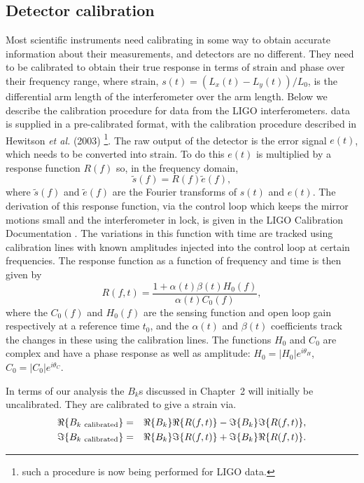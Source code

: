 \subsection{Detector calibration}
Most scientific instruments need calibrating in some way to obtain accurate information about
their measurements, and \gw detectors are no different. They need to be calibrated to obtain their
true response in terms of \gw strain and phase over their frequency range, where strain, $s(t) =
(L_x(t)-L_y(t))/L_0$, is the differential arm length of the interferometer over the arm length.
Below we describe the calibration procedure for data from the LIGO interferometers. \geo data is
supplied in a pre-calibrated format, with the calibration procedure described in Hewitson {\it et
al.} (2003) \cite{Hewitson:2003}\footnote{such a procedure is now being performed for LIGO data.}.
The raw output of the detector is the error signal $e(t)$, which needs to be converted into strain.
To do this $e(t)$ is multiplied by a response function $R(f)$ so, in the frequency domain,
\begin{equation}
\tilde{s}(f) = R(f)\tilde{e}(f),
\end{equation}
where $\tilde{s}(f)$ and $\tilde{e}(f)$ are the Fourier transforms of $s(t)$ and $e(t)$. The
derivation of this response function, via the control loop which keeps the mirror motions small and
the interferometer in lock, is given in the LIGO Calibration Documentation \cite{CalibrationDoc}.
The variations in this function with time are tracked using calibration lines with known amplitudes
injected into the control loop at certain frequencies. The response function as a function of
frequency and time is then given by
\begin{equation}\label{ResponseFunction} 
R(f,t) = \frac{1+\alpha(t)\beta(t)H_0(f)}{\alpha(t)C_0(f)},
\end{equation}
where the $C_0(f)$ and $H_0(f)$ are the sensing function and open loop gain respectively at a
reference time $t_0$, and the $\alpha(t)$ and $\beta(t)$ coefficients track the changes in these
using the calibration lines. The functions $H_0$ and $C_0$ are complex and have a phase response as
well as amplitude: $H_0 = |H_0|e^{i\theta_H}$, $C_0 = |C_0|e^{i\theta_C}$. 

In terms of our analysis the $B_k$s discussed in Chapter~2 will initially be uncalibrated. They are
calibrated to give a strain via.
\begin{eqnarray}
\Re\{B_{k~{\rm{calibrated}}}\} &=& \Re\{B_k\} \Re\{R(f,t)\} -
\Im\{B_k\} \Im\{R(f,t)\}, \nonumber \\
\Im\{B_{k~{\rm{calibrated}}}\} &=& \Re\{B_k\} \Im\{R(f,t)\} +
\Im\{B_k\} \Re\{R(f,t)\}.
\end{eqnarray}

